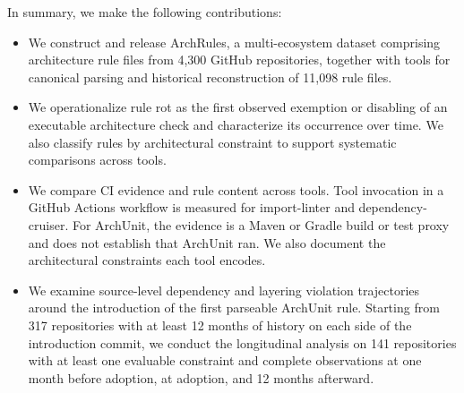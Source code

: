 In summary, we make the following contributions:
\begin{itemize}
  \item We construct and release ArchRules, a multi-ecosystem
  dataset comprising architecture rule files from 4,300 GitHub repositories,
  together with tools for canonical parsing and historical reconstruction
  of 11,098 rule files.

  \item We operationalize rule rot as the first observed
  exemption or disabling of an executable architecture check and
  characterize its occurrence over time. We also classify rules by
  architectural constraint to support systematic comparisons across tools.

  \item We compare CI evidence and rule content across tools.
  Tool invocation in a GitHub Actions workflow is measured for
  import-linter and dependency-cruiser. For ArchUnit, the evidence
  is a Maven or Gradle build or test proxy and does not establish
  that ArchUnit ran. We also document the architectural constraints
  each tool encodes.

  \item We examine source-level dependency and layering violation 
  trajectories around the introduction of the first parseable ArchUnit 
  rule. Starting from 317 repositories with at least 12 months of 
  history on each side of the introduction commit, we conduct the longitudinal 
  analysis on 141 repositories with at least one evaluable constraint and 
  complete observations at one month before adoption, at adoption, and 12 
  months afterward.
\end{itemize}